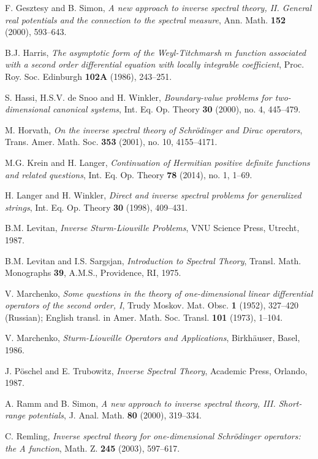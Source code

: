\documentclass[preprint,12pt]{elsarticle}
\begin{document}
\begin{thebibliography}{10000}
 F. Gesztesy and B. Simon, \textit{A new approach to inverse spectral theory, II. General real potentials and the connection to the spectral measure}, Ann. Math. \textbf{152} (2000), 593--643.

 B.J. Harris, \textit{The asymptotic form of the Weyl-Titchmarsh $m$ function associated with a second order differential equation with locally integrable coefficient}, Proc. Roy. Soc. Edinburgh \textbf{102A} (1986), 243--251.

 S. Hassi, H.S.V. de Snoo and H. Winkler, \textit{Boundary-value problems for two-dimensional canonical systems}, Int. Eq. Op. Theory \textbf{30} (2000), no. 4, 445--479.

 M. Horvath, \textit{On the inverse spectral theory of Schr\"odinger and Dirac operators}, Trans. Amer. Math. Soc. \textbf{353} (2001), no. 10, 4155--4171.

 M.G. Krein and H. Langer, \textit{Continuation of Hermitian positive definite functions and related questions}, Int. Eq. Op. Theory \textbf{78} (2014), no. 1, 1--69.

 H. Langer and H. Winkler, \textit{Direct and inverse spectral problems for generalized strings}, Int. Eq. Op. Theory \textbf{30} (1998), 409--431.

 B.M. Levitan, \textit{Inverse Sturm-Liouville Problems}, VNU Science Press, Utrecht, 1987.

 B.M. Levitan and I.S. Sargsjan, \textit{Introduction to Spectral Theory}, Transl. Math. Monographs \textbf{39}, A.M.S., Providence, RI, 1975. 

 V. Marchenko, \textit{Some questions in the theory of one-dimensional linear differential operators of the second order, I}, Trudy Moskov. Mat. Obsc. \textbf{1} (1952), 327--420 (Russian); English transl. in Amer. Math. Soc. Transl. \textbf{101} (1973), 1--104. 

 V. Marchenko, \textit{Sturm-Liouville Operators and Applications}, Birkh\"auser, Basel, 1986.

 J. P\"oschel and E. Trubowitz, \textit{Inverse Spectral Theory}, Academic Press, Orlando, 1987.

 A. Ramm and B. Simon, \textit{A new approach to inverse spectral theory, III. Short-range potentials}, J. Anal. Math. \textbf{80} (2000), 319--334. 

 C. Remling, \textit{Inverse spectral theory for one-dimensional Schr\"odinger operators: the A function}, Math. Z. \textbf{245} (2003), 597--617.


\end{thebibliography}
\end{document}
